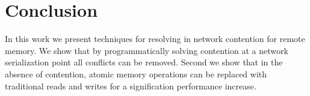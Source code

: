 \section{Conclusion}

In this work we present techniques for resolving in network contention for
remote memory. We show that by programmatically solving contention at a network
serialization point all conflicts can be removed. Second we show that in the
absence of contention, atomic memory operations can be replaced with traditional
reads and writes for a signification performance increase.

